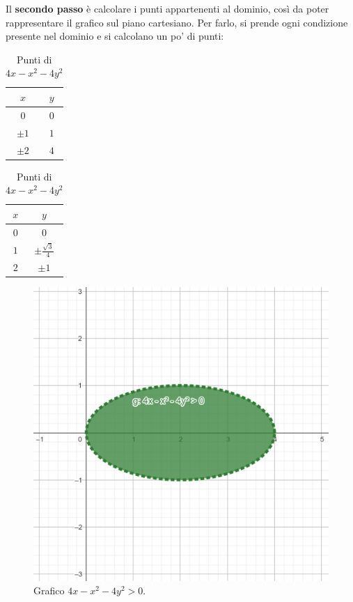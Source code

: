 \documentclass[a4paper]{article}
\begin{document}
	\noindent
	Il \textbf{secondo passo} è calcolare i punti appartenenti al dominio, così da poter rappresentare il grafico sul piano cartesiano. Per farlo, si prende ogni condizione presente nel dominio e si calcolano un po' di punti:
	\begin{table}[!htp]
		\begin{minipage}{.5\textwidth}
			\centering
			\begin{tabular}{@{} c | c @{}}
				\toprule
				$x$ & $y$ \\
				\midrule
				$0$	& $0$ 	\\
				$\pm1$ & $1$	\\
				$\pm2$	& $4$	\\
				\bottomrule
			\end{tabular}
			\caption*{Punti di $y-x^{2}$}
		\end{minipage}
		\begin{minipage}{.5\textwidth}
			\centering
			\begin{tabular}{@{} c | c @{}}
				\toprule
				$x$ & $y$ \\
				\midrule
				$0$	& $0$ \\
				$1$ & $\pm\frac{\sqrt{3}}{4}$	\\
				$2$ & $\pm 1$	\\
				\bottomrule
			\end{tabular}
			\caption*{Punti di $4x-x^{2}-4y^{2}$}
		\end{minipage}
	\end{table}
	\begin{figure}[!htp]
		\centering
		\includegraphics[width=.9\textwidth]{img/grafico-ex3-1.png}
		\caption*{Grafico $4x-x^{2}-4y^{2} > 0$.}
	\end{figure}\newpage
\end{document}
